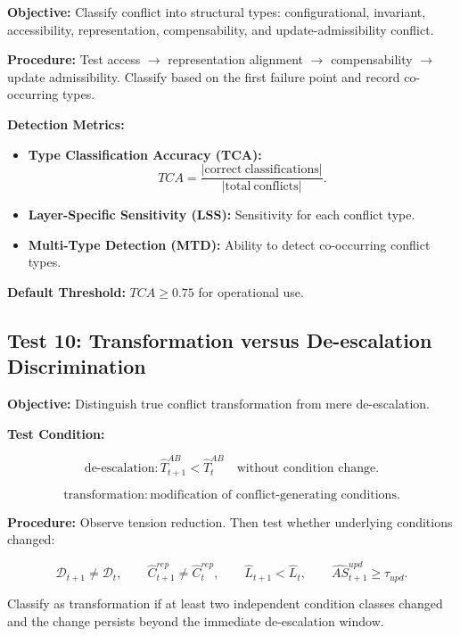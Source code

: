 \documentclass[11pt,a4paper]{article}
\theoremstyle{breakstyle}
\newcommand{\Dadm}{\mathcal{D}}
\newcommand{\Chat}{\widehat{C}}
\newcommand{\That}{\widehat{T}}
\newcommand{\Lhat}{\widehat{L}}
\begin{document}
	\textbf{Objective:} Classify conflict into structural types: configurational, invariant, accessibility, representation, compensability, and update-admissibility conflict.
	
	\textbf{Procedure:} Test access $\rightarrow$ representation alignment $\rightarrow$ compensability $\rightarrow$ update admissibility. Classify based on the first failure point and record co-occurring types.
	
	\textbf{Detection Metrics:}
	\begin{itemize}
		\item \textbf{Type Classification Accuracy (TCA):}
		\[
		TCA =
		\frac{
			|\mathrm{correct\ classifications}|
		}{
			|\mathrm{total\ conflicts}|
		}.
		\]
		
		\item \textbf{Layer-Specific Sensitivity (LSS):} Sensitivity for each conflict type.
		
		\item \textbf{Multi-Type Detection (MTD):} Ability to detect co-occurring conflict types.
	\end{itemize}
	
	\textbf{Default Threshold:} $TCA \geq 0.75$ for operational use.
	
	\subsection*{Test 10: Transformation versus De-escalation Discrimination}
	
	\textbf{Objective:} Distinguish true conflict transformation from mere de-escalation.
	
	\textbf{Test Condition:}
	
	\[
	\mathrm{de\text{-}escalation}:
	\That^{AB}_{t+1} < \That^{AB}_{t}
	\quad
	\text{without condition change}.
	\]
	
	\[
	\mathrm{transformation}:
	\text{modification of conflict-generating conditions}.
	\]
	
	\textbf{Procedure:} Observe tension reduction. Then test whether underlying conditions changed:
	
	\[
	\Dadm_{t+1} \neq \Dadm_t,
	\qquad
	\Chat^{rep}_{t+1} \neq \Chat^{rep}_t,
	\qquad
	\Lhat_{t+1} < \Lhat_t,
	\qquad
	\widehat{AS}^{upd}_{t+1} \geq \tau_{upd}.
	\]
	
	Classify as transformation if at least two independent condition classes changed and the change persists beyond the immediate de-escalation window.
	
\end{document}
